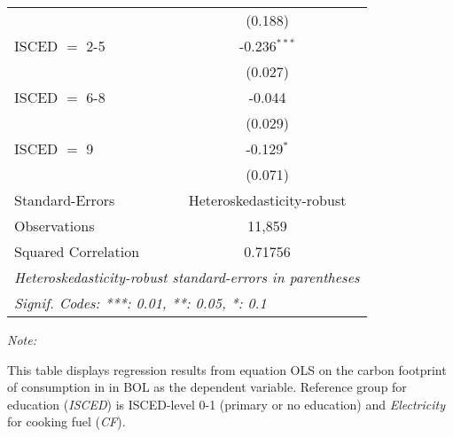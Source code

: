 \begin{table}[htbp!]
\begin{adjustbox}{width = 1\textwidth, max height = 0.95\textheight, center}
\begin{threeparttable}[b]
\begin{tabular}{lc}
                                & (0.188)\\   
            ISCED $=$ 2-5       & -0.236$^{***}$\\   
                                & (0.027)\\   
            ISCED $=$ 6-8       & -0.044\\   
                                & (0.029)\\   
            ISCED $=$ 9         & -0.129$^{*}$\\   
                                & (0.071)\\   
            \midrule 
            Standard-Errors     & Heteroskedasticity-robust \\   
            Observations        & 11,859\\  
            Squared Correlation & 0.71756\\  
            \midrule \midrule
            \multicolumn{2}{l}{\emph{Heteroskedasticity-robust standard-errors in parentheses}}\\
            \multicolumn{2}{l}{\emph{Signif. Codes: ***: 0.01, **: 0.05, *: 0.1}}\\
         \end{tabular}
         
         \begin{tablenotes}\item \medskip \textit{Note:}
            \item This table displays regression results from equation OLS on the carbon footprint of consumption in  in BOL as the dependent variable.  Reference group for education (\textit{ISCED}) is ISCED-level 0-1 (primary or no education) and \textit{Electricity} for cooking fuel (\textit{CF}).
         \end{tablenotes}
      \end{threeparttable}
   \end{adjustbox}
\end{table}


